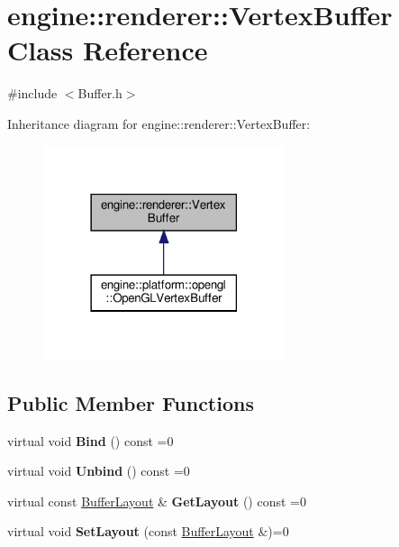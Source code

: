 \hypertarget{classengine_1_1renderer_1_1VertexBuffer}{}\section{engine\+:\+:renderer\+:\+:Vertex\+Buffer Class Reference}
\label{classengine_1_1renderer_1_1VertexBuffer}


{\ttfamily \#include $<$Buffer.\+h$>$}



Inheritance diagram for engine\+:\+:renderer\+:\+:Vertex\+Buffer\+:\nopagebreak
\begin{figure}[H]
\begin{center}
\leavevmode
\includegraphics[width=201pt]{classengine_1_1renderer_1_1VertexBuffer__inherit__graph}
\end{center}
\end{figure}
\subsection*{Public Member Functions}
\begin{DoxyCompactItemize}
\item 
\mbox{\label{classengine_1_1renderer_1_1VertexBuffer_acccb2af8de4a3a557f308757010a1fe7}} 
virtual void {\bfseries Bind} () const =0
\item 
\mbox{\label{classengine_1_1renderer_1_1VertexBuffer_ab2bc17d0e37c25c369367ea6b1137283}} 
virtual void {\bfseries Unbind} () const =0
\item 
\mbox{\label{classengine_1_1renderer_1_1VertexBuffer_ab769bac40b3e30891fa4d5ee35ae6f2b}} 
virtual const \hyperlink{classengine_1_1renderer_1_1BufferLayout}{Buffer\+Layout} \& {\bfseries Get\+Layout} () const =0
\item 
\mbox{\label{classengine_1_1renderer_1_1VertexBuffer_a2885e3856bfb698178b6cd00a4dc7aab}} 
virtual void {\bfseries Set\+Layout} (const \hyperlink{classengine_1_1renderer_1_1BufferLayout}{Buffer\+Layout} \&)=0
\end{DoxyCompactItemize}
